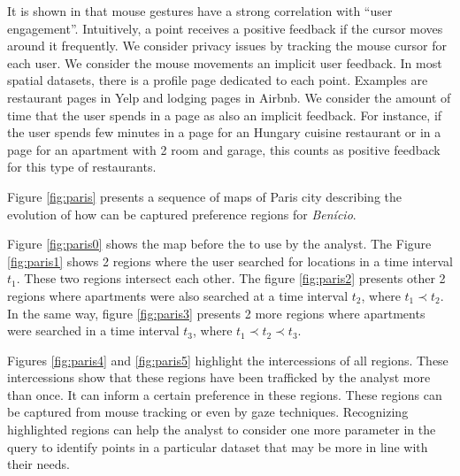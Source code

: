 \documentclass[runningheads,a4paper]{llncs}
\begin{document}
It is shown in \cite{arapakis2014understanding} that mouse gestures have a strong correlation with ``user engagement''. Intuitively, a point receives a positive feedback if the cursor moves around it frequently. We consider privacy issues by tracking the mouse cursor for each user. We consider the mouse movements an implicit user feedback. In most spatial datasets, there is a profile page dedicated to each point. Examples are restaurant pages in Yelp and lodging pages in Airbnb. We consider the amount of time that the user spends in a page as also an implicit feedback. For instance, if the user spends few minutes in a page for an Hungary cuisine restaurant or in a page for an apartment with 2 room and garage, this counts as positive feedback for this type of restaurants.

Figure \ref{fig:paris} presents a sequence of maps of Paris city describing the evolution of how can be captured preference  regions for \textit{Ben\'icio}.

Figure \ref{fig:paris0} shows the map before the to use by the analyst. The Figure \ref{fig:paris1} shows 2 regions where the user searched for locations in a time interval $t_1$. These two regions intersect each other. The figure \ref{fig:paris2} presents other 2 regions where apartments were also searched at a time interval $t_2$, where $t_1 \prec t_2$. In the same way, figure \ref{fig:paris3}  presents 2 more regions where apartments were searched in a time interval $t_3$, where $t_1 \prec t_2 \prec t_ 3$.

Figures \ref{fig:paris4} and \ref{fig:paris5} highlight the intercessions of all regions. These intercessions show that these regions have been trafficked by the analyst more than once. It can inform a certain preference in these regions. These regions can be captured from mouse tracking or even by gaze techniques. Recognizing highlighted regions can help the analyst to consider one more parameter in the query to identify points in a particular dataset that may be more in line with their needs.


\end{document}
